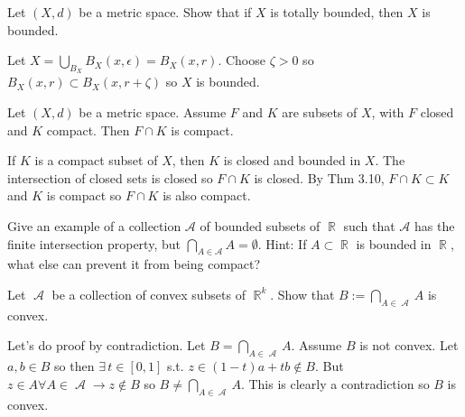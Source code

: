 \documentclass[12pt,letterpaper,boxed]{hmcpset}
\DeclareMathOperator{\A}{\mathcal{A}}
\DeclareMathOperator{\R}{\mathbb{R}}
\begin{document}

\begin{problem}[Exercise 2.24]
Let $(X, d)$ be a metric space. Show that if $X$ is totally bounded, then $X$ is bounded.
\end{problem}

\begin{solution}
Let $X = \bigcup_{B_X} B_X(x , \epsilon) = B_X(x,r)$. Choose $\zeta > 0$ so $B_X(x,r)\subset B_X(x, r + \zeta)$ so $X$ is bounded. 
\end{solution}

\begin{problem}[Exercise 3.12]
Let $(X, d)$ be a metric space. Assume $F$ and $K$ are subsets of $X$, with $F$ closed and $K$ compact. Then $F\cap K$ is compact.
\end{problem}

\begin{solution}
If $K$ is a compact subset of $X$, then $K$ is closed and bounded in $X$. The intersection of closed sets is closed so $F\cap K$ is closed. By Thm 3.10, $F \cap K \subset K$ and $K$ is compact so $F \cap K$ is also compact.
\end{solution}

\begin{problem}[Exercise 3.26]
Give an example of a collection $\mathcal{A}$ of bounded subsets of $\R$ such that $\mathcal{A}$ has the finite intersection property, but $\bigcap_{A \in \mathcal{A}} A = \emptyset$. Hint: If $A \subset \R$ is bounded in $\R$, what else can prevent it from being compact?
\end{problem}

\begin{solution}

\end{solution}

\begin{problem}[Exercise 5.3]
Let $\A$ be a collection of convex subsets of $\R^{k}.$ Show that $B := \bigcap_{A \in \A} A$ is convex. 
\end{problem}

\begin{solution}
Let's do proof by contradiction. Let $B=\bigcap_{A \in \A} A$. Assume $B$ is not convex. Let $a, b \in B$ so then $\exists \, t\in [0, 1]$ s.t. $z \in (1 - t)a + tb \notin B$. But $z \in A \forall A \in \A \rightarrow z \notin B$ so $B \neq \bigcap_{A \in \A} A.$ This is clearly a contradiction so $B$ is convex.
\end{solution}
\end{document}
